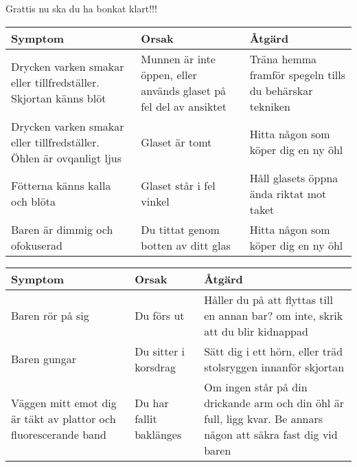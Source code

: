 Grattis nu ska du ha bonkat klart!!!\newpage


\begin{adjustbox}{angle=-90}
  \begin{tabular}{|p{0.3\textheight}|p{0.3\textheight}|p{0.3\textheight}|}
    \hline
    \textbf{Symptom}                                                     & \textbf{Orsak} & \textbf{Åtgärd} \\
    \hline
    Drycken varken smakar eller tillfredställer. Skjortan känns blöt     &
    Munnen är inte öppen, eller används glaset på fel del av ansiktet    &
    Träna hemma framför spegeln tills du behärskar tekniken                                                 \\
    \hline
    Drycken varken smakar eller tillfredställer. Öhlen är ovqanligt ljus &
    Glaset är tomt                                                       &
    Hitta någon som köper dig en ny öhl                                                                     \\
    \hline
    Fötterna känns kalla och blöta                                       &
    Glaset står i fel vinkel                                             &
    Håll glasets öppna ända riktat mot taket                                                                \\
    \hline
    Baren är dimmig och ofokuserad                                       &
    Du tittat genom botten av ditt glas                                  &
    Hitta någon som köper dig en ny öhl                                                                     \\
    \hline
  \end{tabular}
\end{adjustbox}

\begin{adjustbox}{angle=-90}
  \begin{tabular}{|p{0.3\textheight}|p{0.3\textheight}|p{0.3\textheight}|}
    \hline
    \textbf{Symptom}                                                & \textbf{Orsak} & \textbf{Åtgärd}              \\
    \hline
    Baren rör på sig                                                &
    Du förs ut                                                      &
    Håller du på att flyttas till en annan bar? om inte, skrik att du blir kidnappad                                \\
    \hline
    Baren gungar                                                    &
    Du sitter i korsdrag                                            &
    Sätt dig i ett hörn, eller träd stolsryggen innanför skjortan                                                   \\
    \hline
    Väggen mitt emot dig är täkt av plattor och fluorescerande band &
    Du har fallit baklänges                                         &
    Om ingen står på din drickande arm och din öhl är full, ligg kvar. Be annars någon att säkra fast dig vid baren \\
    \hline
  \end{tabular}
\end{adjustbox}


